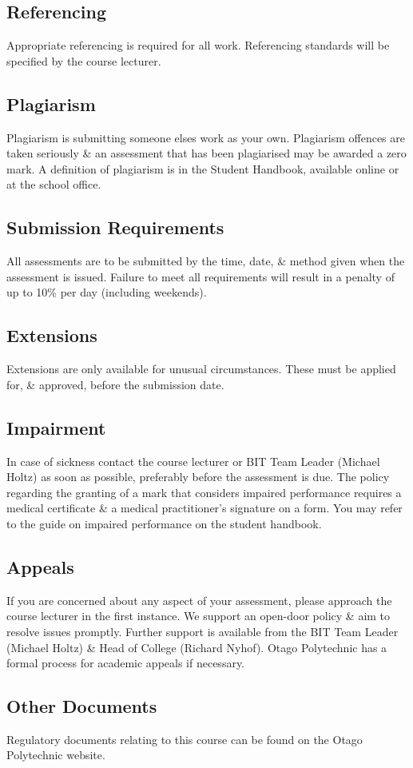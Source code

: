 \documentclass{article}
\begin{document}
\subsection*{Referencing}
Appropriate referencing is required for all work. Referencing standards will be specified by the course lecturer.

\subsection*{Plagiarism}
Plagiarism is submitting someone elses work as your own. Plagiarism offences are taken seriously \& an assessment that has been plagiarised may be awarded a zero mark. A definition of plagiarism is in the Student Handbook, available online or at the school office.

\subsection*{Submission Requirements}
All assessments are to be submitted by the time, date, \& method given when the assessment is issued. Failure to meet all requirements will result in a penalty of up to 10\% per day (including weekends).

\subsection*{Extensions}
Extensions are only available for unusual circumstances. These must be applied for, \& approved, before the submission date.

\subsection*{Impairment}
In case of sickness contact the course lecturer or BIT Team Leader (Michael Holtz) as soon as possible, preferably before the assessment is due. The policy regarding the granting of a mark that considers impaired performance requires a medical certificate \& a medical practitioner’s signature on a form. You may refer to the guide on impaired performance on the student handbook.

\subsection*{Appeals}
If you are concerned about any aspect of your assessment, please approach the course lecturer in the first instance. We support an open-door policy \& aim to resolve issues promptly. Further support is available from the BIT Team Leader (Michael Holtz) \& Head of College (Richard Nyhof). Otago Polytechnic has a formal process for academic appeals if necessary.

\subsection*{Other Documents}
Regulatory documents relating to this course can be found on the Otago Polytechnic website.
\end{document}
